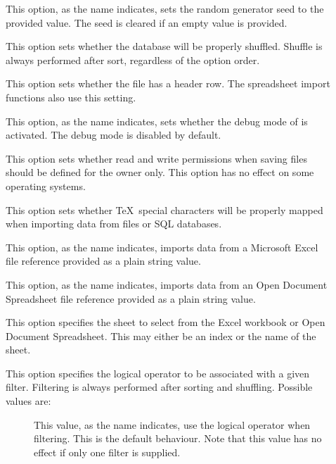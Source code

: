 \begin{description}
\begin{description}
\item[] This option, as the name indicates, sets the random generator seed to the provided value. The seed is cleared if an empty value is provided.

\item[] This option sets whether the database will be properly shuffled. Shuffle is always performed after sort, regardless of the option order.

\item[] This option sets whether the  file has a header row. The
spreadsheet import functions also use this setting.

\item[] This option, as the name indicates, sets whether the debug mode of  is activated. The debug mode is disabled by default.

\item[] This option sets whether read and write permissions when saving  files should be defined for the owner only. This option has no effect on some operating systems.

\item[] This option sets whether \TeX\ special characters will be properly mapped when importing data from  files or \gls{SQL} databases.

\item[] This option, as the name indicates, imports data from a Microsoft Excel  file reference provided as a plain string value.

\item[] This option, as the name indicates, imports data from an Open Document Spreadsheet  file reference provided as a plain string value.

\item[] This option specifies the sheet to select from the Excel workbook or Open Document Spreadsheet. This may either be an index or the name of the sheet.

\item[] This option specifies the logical operator to be associated with a given filter. Filtering is always performed after sorting and shuffling. Possible values are:

\begin{description}
\item[\hfill\hphantom{w}] This value, as the name indicates, use the logical  operator when filtering. This is the default behaviour. Note that this value has no effect if only one filter is supplied.


\end{description}
\end{description}
\end{description}
